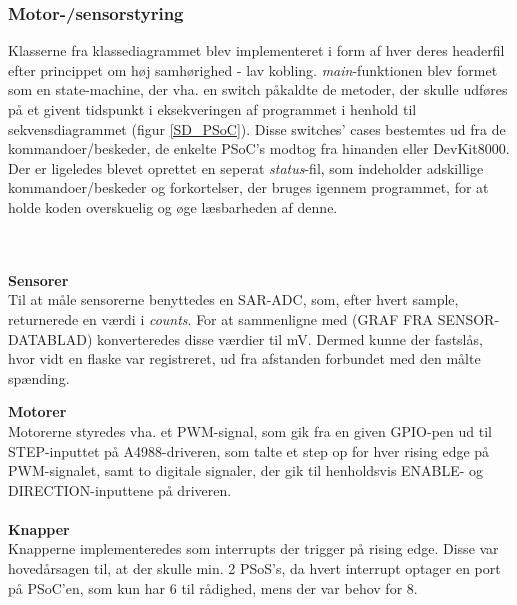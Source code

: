 \subsubsection{Motor-/sensorstyring}
Klasserne fra klassediagrammet blev implementeret i form af hver deres headerfil efter princippet om høj samhørighed - lav kobling. \textit{main}-funktionen blev formet som en state-machine, der vha. en switch påkaldte de metoder, der skulle udføres på et givent tidspunkt i eksekveringen af programmet i henhold til sekvensdiagrammet (figur \ref{SD_PSoC}). Disse switches' cases bestemtes ud fra de kommandoer/beskeder, de enkelte PSoC's modtog fra hinanden eller DevKit8000. Der er ligeledes blevet oprettet en seperat \textit{status}-fil, som indeholder adskillige kommandoer/beskeder og forkortelser, der bruges igennem programmet, for at holde koden overskuelig og øge læsbarheden af denne.

 \\
\\
\textbf{Sensorer} \\
Til at måle sensorerne benyttedes en SAR-ADC, som, efter hvert sample, returnerede en værdi i \textit{counts}. For at sammenligne med (GRAF FRA SENSOR-DATABLAD) konverteredes disse værdier til mV. Dermed kunne der fastslås, hvor vidt en flaske var registreret, ud fra afstanden forbundet med den målte spænding.

\textbf{Motorer} \\
Motorerne styredes vha. et PWM-signal, som gik fra en given GPIO-pen ud til STEP-inputtet på A4988-driveren, som talte et step op for hver rising edge på PWM-signalet, samt to digitale signaler, der gik til henholdsvis ENABLE- og DIRECTION-inputtene på driveren. \\
\\
\textbf{Knapper} \\
Knapperne implementeredes som interrupts der trigger på rising edge. Disse var hovedårsagen til, at der skulle min. 2 PSoS's, da hvert interrupt optager en port på PSoC'en, som kun har 6 til rådighed, mens der var behov for 8.